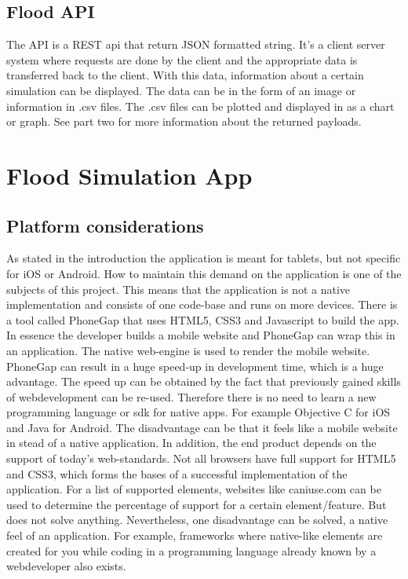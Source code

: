 \subsection{Flood API}
The API is a REST api that return JSON formatted string. It's a client server system where requests are done by the client and the appropriate data is transferred back to the client. With this data, information about a certain simulation can be displayed. The data can be in the form of an image or information in .csv files. The .csv files can be plotted and displayed in as a chart or graph. See part two for more information about the returned payloads.



\section{Flood Simulation App}
\subsection{Platform considerations}
As stated in the introduction the application is meant for tablets, but not specific for iOS or Android. How to maintain this demand on the application is one of the subjects of this project. This means that the application is not a native implementation and consists of one code-base and runs on more devices. There is a tool called PhoneGap  \cite{PhoneGap} that uses HTML5, CSS3 and Javascript to build the app. In essence the developer builds a mobile website and PhoneGap can wrap this in an application. The native web-engine is used to render the mobile website. PhoneGap can result in a huge speed-up in development time, which is a huge advantage.  The speed up can be obtained by the fact that previously gained skills of webdevelopment can be re-used. Therefore there is no need to learn a new programming language or sdk for native apps. For example Objective C for iOS and Java for Android. The disadvantage can be that it feels like a mobile website in stead of a native application. In addition, the end product depends on the support of today's web-standards. Not all browsers have full support for HTML5 and CSS3, which forms the bases of a successful implementation of the application. For a list of supported elements, websites like caniuse.com \cite{CSS3} can be used to determine the percentage of support for a certain element/feature. But does not solve anything. Nevertheless, one disadvantage can be solved, a native feel of an application. For example, frameworks where native-like elements are created for you while coding in a programming language already known by a webdeveloper also exists.

